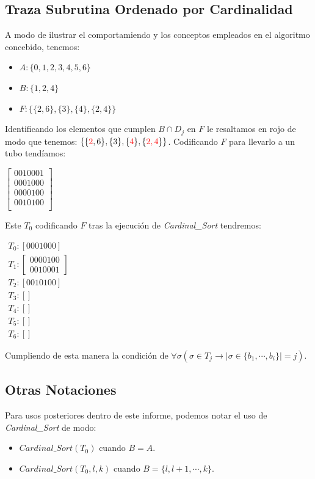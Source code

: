 \documentclass[12pt, letterpaper, twoside]{article}
\begin{document}
    \subsection{Traza Subrutina Ordenado por Cardinalidad}
    A modo de ilustrar el comportamiendo y los conceptos empleados en el algoritmo concebido, tenemos:
    \begin{itemize}
        \item $A: \{0, 1, 2, 3, 4, 5, 6\}$
        \item $B: \{1, 2, 4\}$
        \item $F: \{\{2, 6\}, \{3\}, \{4\}, \{2, 4\}\}$
    \end{itemize}
    Identificando los elementos que cumplen $B\cap D_j$ en $F$ le resaltamos en rojo de modo que tenemos: $\{\{\textcolor{red}{2}, 6\}, \{3\}, \{\textcolor{red}{4}\}, \{\textcolor{red}{2, 4}\}\}$. Codificando $F$ para llevarlo a un tubo tendíamos: 


    $
        \begin{bmatrix}
            0 0 1 0 0 0 1 \\
            0 0 0 1 0 0 0 \\
            0 0 0 0 1 0 0 \\
            0 0 1 0 1 0 0 \\
        \end{bmatrix}
    $ 


    Este $T_0$ codificando $F$ tras la ejecución de \emph{Cardinal\_Sort} tendremos: 

        $
        \begin{array}{l}
            T_0: [ 0 0 0 1 0 0 0 ] \\
            T_1: \left[ \begin{array}{l} 0 0 0 0 1 0 0 \\ 0 0 1 0 0 0 1 \end{array} \right] \\
            T_2: [0 0 1 0 1 0 0] \\
            T_3: [] \\
            T_4: [] \\
            T_5: [] \\
            T_6: [] 
        \end{array}
        $ 


    Cumpliendo de esta manera la condición de $\forall\sigma(\sigma\in T_j \rightarrow|\sigma\in\{b_1,\cdots,b_i\}|=j)$.

    \subsection{Otras Notaciones}
    Para usos posteriores dentro de este informe, podemos notar el uso de \emph{Cardinal\_Sort} de modo:
    \begin{itemize}
        \item $Cardinal\_Sort(T_0)$ cuando $B=A$.
        \item $Cardinal\_Sort(T_0, l, k)$ cuando $B=\{l, l+1,\cdots,k\}$.
    \end{itemize}
    \newpage
\end{document}

